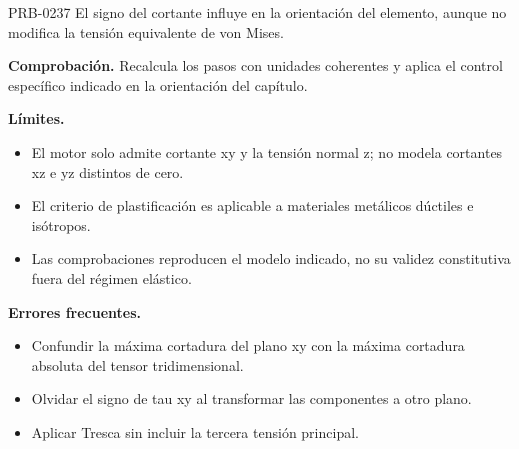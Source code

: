 \begin{studiumworked}{PRB-0237}
El signo del cortante influye en la orientación del elemento, aunque no modifica la tensión equivalente de von Mises.

\par\textbf{Comprobación.} Recalcula los pasos con unidades coherentes y aplica el control específico indicado en la orientación del capítulo.

\textbf{Límites.}\begin{itemize}\item El motor solo admite cortante xy y la tensión normal z; no modela cortantes xz e yz distintos de cero.
\item El criterio de plastificación es aplicable a materiales metálicos dúctiles e isótropos.
\item Las comprobaciones reproducen el modelo indicado, no su validez constitutiva fuera del régimen elástico.\end{itemize}

\textbf{Errores frecuentes.}\begin{itemize}\item Confundir la máxima cortadura del plano xy con la máxima cortadura absoluta del tensor tridimensional.
\item Olvidar el signo de tau xy al transformar las componentes a otro plano.
\item Aplicar Tresca sin incluir la tercera tensión principal.\end{itemize}

\end{studiumworked}

\Needspace{.3\textheight}

